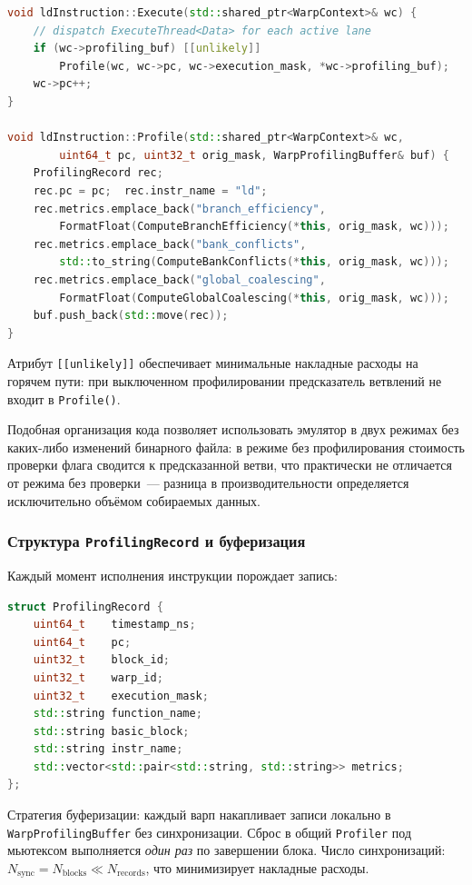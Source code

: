 \begin{lstlisting}[language=C++, caption={Автогенерируемые Execute() и Profile() для ld}]
void ldInstruction::Execute(std::shared_ptr<WarpContext>& wc) {
    // dispatch ExecuteThread<Data> for each active lane
    if (wc->profiling_buf) [[unlikely]]
        Profile(wc, wc->pc, wc->execution_mask, *wc->profiling_buf);
    wc->pc++;
}

void ldInstruction::Profile(std::shared_ptr<WarpContext>& wc,
        uint64_t pc, uint32_t orig_mask, WarpProfilingBuffer& buf) {
    ProfilingRecord rec;
    rec.pc = pc;  rec.instr_name = "ld";
    rec.metrics.emplace_back("branch_efficiency",
        FormatFloat(ComputeBranchEfficiency(*this, orig_mask, wc)));
    rec.metrics.emplace_back("bank_conflicts",
        std::to_string(ComputeBankConflicts(*this, orig_mask, wc)));
    rec.metrics.emplace_back("global_coalescing",
        FormatFloat(ComputeGlobalCoalescing(*this, orig_mask, wc)));
    buf.push_back(std::move(rec));
}
\end{lstlisting}

Атрибут \texttt{[[unlikely]]} обеспечивает минимальные накладные расходы
на горячем пути: при выключенном профилировании предсказатель ветвлений
не входит в \texttt{Profile()}.

Подобная организация кода позволяет использовать эмулятор в двух режимах
без каких-либо изменений бинарного файла: в режиме без профилирования
стоимость проверки флага сводится к предсказанной ветви, что практически
не отличается от режима без проверки~--- разница в производительности
определяется исключительно объёмом собираемых данных.

\subsubsection{Структура \texttt{ProfilingRecord} и буферизация}

Каждый момент исполнения инструкции порождает запись:

\begin{lstlisting}[language=C++, caption={Структура ProfilingRecord}]
struct ProfilingRecord {
    uint64_t    timestamp_ns;
    uint64_t    pc;
    uint32_t    block_id;
    uint32_t    warp_id;
    uint32_t    execution_mask;
    std::string function_name;
    std::string basic_block;
    std::string instr_name;
    std::vector<std::pair<std::string, std::string>> metrics;
};
\end{lstlisting}

Стратегия буферизации: каждый варп накапливает записи локально в \\
\texttt{WarpProfilingBuffer} без синхронизации. Сброс в общий
\texttt{Profiler} под мьютексом выполняется \textit{один раз} по
завершении блока. Число синхронизаций:
$N_{\mathrm{sync}} = N_{\mathrm{blocks}} \ll N_{\mathrm{records}}$,
что минимизирует накладные расходы.

